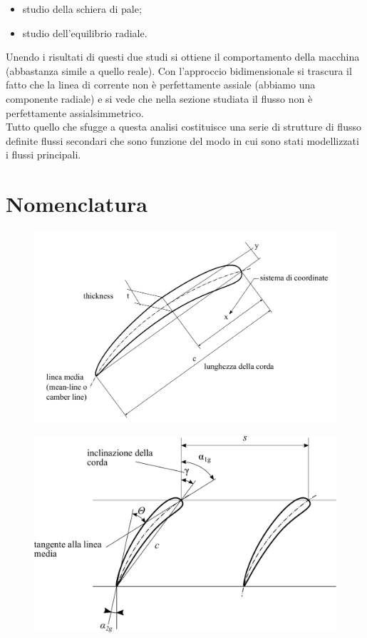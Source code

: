 \begin{itemize}
\item studio della schiera di pale;
\item studio dell'equilibrio radiale.
\end{itemize}
Unendo i risultati di questi due studi si ottiene il comportamento della macchina (abbastanza simile a quello reale).
Con l’approccio bidimensionale si trascura il fatto che la linea di corrente non è perfettamente assiale (abbiamo una componente radiale) e si vede che nella sezione studiata il flusso non è perfettamente assialsimmetrico.\\
Tutto quello che sfugge a questa analisi costituisce una serie di strutture di flusso definite flussi secondari che sono funzione del modo in cui sono stati modellizzati i flussi principali.
\section{Nomenclatura}
\begin{figure}[h!]
\centering
\begin{minipage}{.5\textwidth}
  \centering
  \includegraphics[width=\linewidth]{fig/profiloDef.pdf}
  \label{fig:profiloDef}
\end{minipage}
\begin{minipage}{.48\textwidth}
  \centering
  \includegraphics[width=.98\linewidth]{fig/schiera_2.pdf}
  \label{fig:schiera_2}
\end{minipage}
\end{figure}
